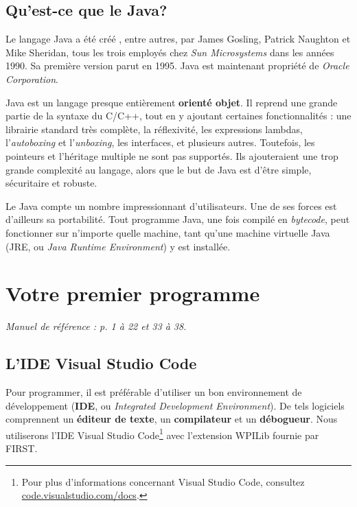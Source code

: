 \documentclass[12pt]{report}
\begin{document}
%
\section{Qu'est-ce que le Java?}
%
%
Le langage Java a été créé , entre autres, par James Gosling, Patrick Naughton et Mike Sheridan, tous les trois employés chez \emph{Sun Microsystems} dans les années 1990. Sa première version parut en 1995. Java est maintenant propriété de \emph{Oracle Corporation}.

Java est un langage presque entièrement \textbf{orienté objet}. Il reprend une grande partie de la syntaxe du C/C++, tout en y ajoutant certaines fonctionnalités : une librairie standard très complète, la réflexivité, les expressions lambdas, l'\emph{autoboxing} et l'\emph{unboxing}, les interfaces, et plusieurs autres.  Toutefois, les pointeurs et l'héritage multiple ne sont pas supportés. Ils ajouteraient une trop grande complexité au langage, alors que le but de Java est d'être simple, sécuritaire et robuste.

Le Java compte un nombre impressionnant d'utilisateurs. Une de ses forces est d'ailleurs sa portabilité. Tout programme Java, une fois compilé en \emph{bytecode}, peut fonctionner sur n'importe quelle machine, tant qu'une machine virtuelle Java (JRE, ou \emph{Java Runtime Environment}) y est installée.




%
\chapter{Votre premier programme}

\textit{Manuel de référence : p. 1 à 22 et 33 à 38.}

% 
%
\section{L'IDE Visual Studio Code}
%
Pour programmer, il est préférable d'utiliser un bon environnement de développement (\textbf{IDE}, ou \emph{Integrated Development Environment}). De tels logiciels comprennent un \textbf{éditeur de texte}, un \textbf{compilateur} et un \textbf{débogueur}. Nous utiliserons l'IDE Visual Studio Code\footnote{Pour plus d'informations concernant Visual Studio Code, consultez \href{https://code.visualstudio.com/docs}{code.visualstudio.com/docs}.} avec l'extension WPILib fournie par FIRST.
\end{document}
